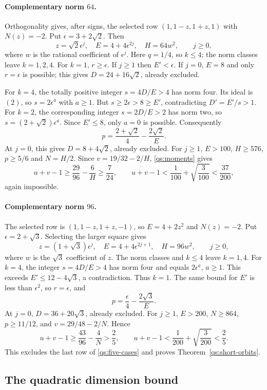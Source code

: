\documentclass[11pt,a4paper]{article}
\theoremstyle{definition}\newtheorem{definition}[theorem]{Definition}
\theoremstyle{remark}\newtheorem{remark}[theorem]{Remark}
\numberwithin{equation}{section}
\begin{document}
\paragraph{Complementary norm $64$.}
Orthogonality gives, after signs, the selected row
$(1,1-z,1+z,1)$ with $N(z)=-2$. Put $\epsilon=3+2\sqrt2$.
Then
\[
 z=\sqrt2\epsilon^j,\quad E=4+4\epsilon^{2j},\quad
 H=64w^2,\qquad j\ge0,
\]
where $w$ is the rational coefficient of $\epsilon^j$.
Here $q=1/4$, so $k\le4$; the norm classes leave $k=1,2,4$.
For $k=1$, $r\ge\epsilon$. If $j\ge1$ then $E'<\epsilon$.
If $j=0$, $E=8$ and only $r=\epsilon$ is possible; this gives
$D=24+16\sqrt2$, already excluded.

For $k=4$, the totally positive integer $s=4D/E>4$ has norm four.
Its ideal is $(2)$, so $s=2\epsilon^a$ with $a\ge1$.
But $s\ge2\epsilon>8\ge E'$, contradicting $D'=E'/s>1$.
For $k=2$, the corresponding integer $s=2D/E>2$ has norm two,
so $s=(2+\sqrt2)\epsilon^a$. Since $E'\le8$, only $a=0$ is possible.
Consequently
\[
 p=\frac{2+\sqrt2}{4}-\frac{2\sqrt2}{E}.
\]
At $j=0$, this gives $D=8+4\sqrt2$, already excluded.
For $j\ge1$, $E>100$, $H\ge576$, $p\ge5/6$ and $N=H/2$.
Since $v=19/32-2/H$, \eqref{qs:moments} gives
\[
 u+v-1\ge\frac{29}{96}-\frac6H\ge\frac7{24},
 \qquad
 u+v-1<\frac1{100}+\sqrt{\frac3{100}}<\frac{37}{200},
\]
again impossible.

\paragraph{Complementary norm $96$.}
The selected row is $(1,1-z,1+z,-1)$, so $E=4+2z^2$
and $N(z)=-2$.
Put $\epsilon=2+\sqrt3$. Selecting the larger square gives
\[
 z=(1+\sqrt3)\epsilon^j,\quad E=4+4\epsilon^{2j+1},\quad
 H=96w^2,\qquad j\ge0,
\]
where $w$ is the $\sqrt3$ coefficient of $z$.
The norm classes and $k\le4$ leave $k=1,4$.
For $k=4$, the integer $s=4D/E>4$ has norm four and equals
$2\epsilon^a$, $a\ge1$. This exceeds
$E'\le12-4\sqrt3$, a contradiction. Thus $k=1$.
The same bound for $E'$ is less than $\epsilon^2$, so $r=\epsilon$,
and
\[
 p=\frac\epsilon4-\frac{2\sqrt3}{E}.
\]
At $j=0$, $D=36+20\sqrt3$, already excluded.
For $j\ge1$, $E>200$, $N\ge864$, $p\ge11/12$, and
$v=29/48-2/N$. Hence
\[
 u+v-1\ge\frac{43}{96}-\frac4N>\frac25,
 \qquad
 u+v-1<\frac1{200}+\sqrt{\frac3{200}}<\frac25.
\]
This excludes the last row of \eqref{qs:five-cases} and proves
Theorem~\ref{qs:short-orbits}.

\subsection{The quadratic dimension bound}\label{quad:opt:section}
\end{document}
